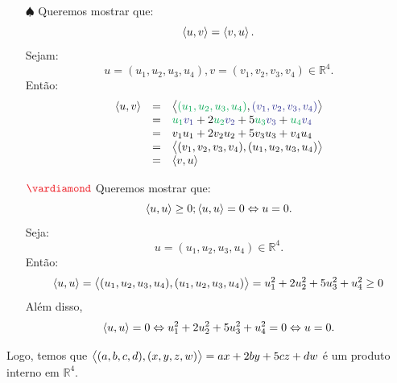 \documentclass[11pt,a4paper]{article}
\begin{document}
{\begin{itemize}
\[\begin{array}{rcl}
\end{array}
\]
\item[$\spadesuit$] Queremos mostrar que:
\[
\left\langle u,v \right\rangle = \left\langle v,u \right\rangle.
\]
Sejam:
\[
u = (u_1, u_2, u_3, u_4), v = (v_1, v_2, v_3, v_4) \in \mathbb{R}^4.
\]
Então:
\[
\begin{array}{rcl}
\prin{u,v} &=& \prin{\textcolor{Green}{(u_1, u_2, u_3, u_4)}, \textcolor{Blue}{(v_1, v_2, v_3, v_4)} } \\
&=&\textcolor{Green}{u_1} \textcolor{Blue}{v_1} + 2\textcolor{Green}{ u_2} \textcolor{Blue}{v_2} + 5\textcolor{Green}{ u_3} \textcolor{Blue}{v_3} + \textcolor{Green}{ u_4} \textcolor{Blue}{v_4} \\
&=& v_1u_1 + 2v_2u_2 + 5v_3u_3 + v_4u_4 \\
&=& \prin{(v_1, v_2, v_3, v_4),(u_1, u_2, u_3, u_4)} \\
&=& \prin{v,u}
\end{array}
\]
\item[$\textcolor{Red}{\vardiamond}$] Queremos mostrar que:
\[
\left\langle u,u \right\rangle \ge 0; \left\langle u,u \right\rangle = 0 \Leftrightarrow u = 0.
\]
Seja:
\[
u = (u_1, u_2, u_3, u_4) \in \mathbb{R}^4.
\]
Então:
\[
\left\langle u,u \right\rangle = \left\langle (u_1, u_2, u_3, u_4),(u_1, u_2, u_3, u_4) \right\rangle = u_1^2 +2u_2^2 + 5u_3^2 + u_4^2 \ge 0
\]
Além disso, 
\[
\left\langle u,u \right\rangle = 0 \Leftrightarrow u_1^2 +2u_2^2 + 5u_3^2 + u_4^2 = 0 \Leftrightarrow u = 0.
\]
\end{itemize}
Logo, temos que $\left\langle (a,b,c,d), (x,y,z,w) \right\rangle = ax + 2by + 5cz + dw$ é um produto interno em $\mathbb{R}^4.$

\dividiritens{
\task[\pers{b}]
}
}

\end{document}
